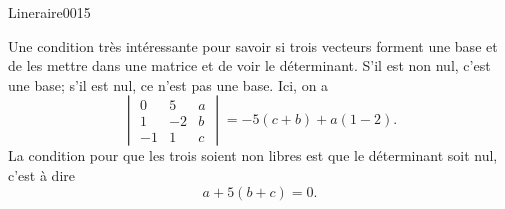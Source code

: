 \begin{corrige}{Lineraire0015}

	Une condition très intéressante pour savoir si trois vecteurs forment une base et de les mettre dans une matrice et de voir le déterminant. S'il est non nul, c'est une base; s'il est nul, ce n'est pas une base. Ici, on a
	\begin{equation}
		\begin{vmatrix}
			0	&	5	&	a	\\
			1	&	-2	&	b	\\
			-1	&	1	&	c
		\end{vmatrix}=
		-5(c+b)+a(1-2).
	\end{equation}
	La condition pour que les trois soient non libres est que le déterminant soit nul, c'est à dire
	\begin{equation}
		a+5(b+c)=0.
	\end{equation}
	

\end{corrige}
